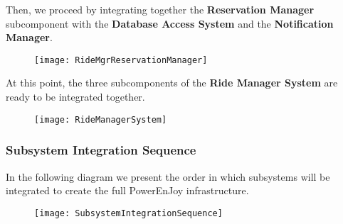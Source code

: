 Then, we proceed by integrating together the \textbf{Reservation Manager} subcomponent with the \textbf{Database Access System} and the \textbf{Notification Manager}.
\begin{figure}[H]
	\centering
	\texttt{[image: RideMgrReservationManager]}
\end{figure}

At this point, the three subcomponents of the \textbf{Ride Manager System} are ready to be integrated together.
\begin{figure}[H]
	\centering
	\texttt{[image: RideManagerSystem]}
\end{figure}
\newpage
\subsubsection{Subsystem  Integration  Sequence} 
In the following diagram we present the  order  in  which  subsystems  will  be  integrated to create the full PowerEnJoy infrastructure.

\begin{figure}[H]
	\centering
	\texttt{[image: SubsystemIntegrationSequence]}
\end{figure}